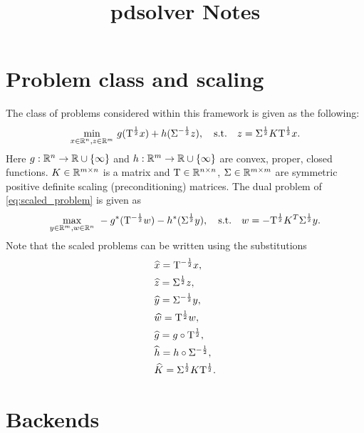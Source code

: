 \documentclass[english,11pt,a4paper]{article}
\title{pdsolver Notes}
\begin{document}
\maketitle

\section{Problem class and scaling}
The class of problems considered within this framework is given as the following:
\begin{equation}
  \underset{x \in \mathbb{R}^n, z \in \mathbb{R}^m} \min ~ g( \mathrm{T}^{\frac{1}{2}} x) + h(\Sigma^{-\frac{1}{2}} z), \quad \text{s.t.} \quad z = \Sigma^{\frac{1}{2}} K \mathrm{T}^{\frac{1}{2}} x.
  \label{eq:scaled_problem}
\end{equation}
Here $g : \mathbb{R}^n \to \mathbb{R} \cup \{ \infty \}$ and $h : \mathbb{R}^m \to \mathbb{R} \cup \{ \infty \}$ are convex, proper, closed functions. $K \in \mathbb{R}^{m \times n}$ is a matrix and $\mathrm{T} \in \mathbb{R}^{n \times n}$, $\Sigma \in \mathbb{R}^{m \times m}$ are symmetric positive definite scaling (preconditioning) matrices. The dual problem of \eqref{eq:scaled_problem} is given as
\begin{equation}
  \underset{y \in \mathbb{R}^m, w \in \mathbb{R}^n} \max ~ -g^*(\mathrm{T}^{-\frac{1}{2}} w) - h^*(\Sigma^{\frac{1}{2}} y), \quad \text{s.t.} \quad w=-\mathrm{T}^{\frac{1}{2}} K^T \Sigma^{\frac{1}{2}} y.
  \label{eq:scaled_dual_problem}
\end{equation}
Note that the scaled problems can be written using the substitutions
\begin{equation}
  \begin{aligned}
    &\widehat x = \mathrm{T}^{-\frac{1}{2}} x, \\
    &\widehat z = \Sigma^{\frac{1}{2}} z, \\
    &\widehat y = \Sigma^{-\frac{1}{2}} y, \\
    &\widehat w = \mathrm{T}^{\frac{1}{2}} w, \\
    &\widehat g = g \circ \mathrm{T}^{\frac{1}{2}}, \\
    &\widehat h = h \circ \Sigma^{-\frac{1}{2}}, \\
    &\widehat K = \Sigma^{\frac{1}{2}} K \mathrm{T}^{\frac{1}{2}}.
  \end{aligned}
\end{equation}

\section{Backends}
\end{document}
